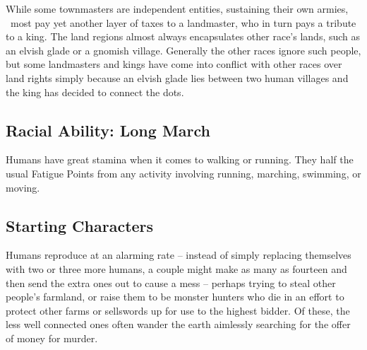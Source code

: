 \begin{multicols}{2}
While some townmasters are independent entities, sustaining their own armies, \ most pay yet another layer of taxes to a landmaster, who in turn pays a tribute to a king. The land regions almost always encapsulates other race's lands, such as an elvish glade or a gnomish village. Generally the other races ignore such people, but some landmasters and kings have come into conflict with other races over land rights simply because an elvish glade lies between two human villages and the king has decided to connect the dots.

\subsection{Racial Ability: Long March}

Humans have great stamina when it comes to walking or running. They half the usual Fatigue Points from any activity involving running, marching, swimming, or moving.

\subsection{Starting Characters}

Humans reproduce at an alarming rate -- instead of simply replacing themselves with two or three more humans, a couple might make as many as fourteen and then send the extra ones out to cause a mess -- perhaps trying to steal other people's farmland, or raise them to be monster hunters who die in an effort to protect other farms or sellswords up for use to the highest bidder.
Of these, the less well connected ones often wander the earth aimlessly searching for the offer of money for murder.

\end{multicols}


